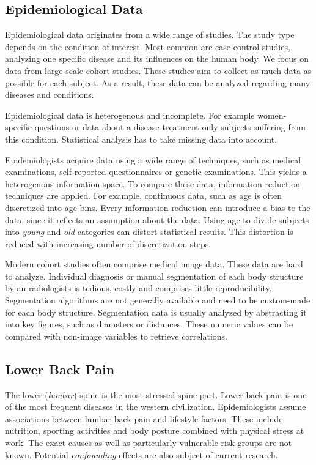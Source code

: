 \documentclass[a4paper,twoside]{style/article}
\begin{document}
\subsection{Epidemiological Data}
Epidemiological data originates from a wide range of studies.
The study type depends on the condition of interest.
Most common are case-control studies, analyzing one specific disease and its influences on the human body.
We focus on data from large scale cohort studies.
These studies aim to collect as much data as possible for each subject.
As a result, these data can be analyzed regarding many diseases and conditions.

Epidemiological data is heterogenous and incomplete.
For example women-specific questions or data about a disease treatment only subjects suffering from this condition.
Statistical analysis has to take missing data into account.

Epidemiologists acquire data using a wide range of techniques, such as medical examinations, self reported questionnaires or genetic examinations.
This yields a heterogenous information space.
To compare these data, information reduction techniques are applied.
For example, continuous data, such as age is often discretized into age-bins.
Every information reduction can introduce a bias to the data, since it reflects an assumption about the data.
Using age to divide subjects into \emph{young} and \emph{old} categories can distort statistical results.
This distortion is reduced with increasing number of discretization steps.

Modern cohort studies often comprise medical image data.
These data are hard to analyze.
Individual diagnosis or manual segmentation of each body structure by an radiologists is tedious, costly and comprises little reproducibility.
Segmentation algorithms are not generally available and need to be custom-made for each body structure.
Segmentation data is usually analyzed by abstracting it into key figures, such as diameters or distances.
These numeric values can be compared with non-image variables to retrieve correlations.
\subsection{Lower Back Pain}
The lower (\emph{lumbar}) spine is the most stressed spine part.
Lower back pain is one of the most frequent diseases in the western civilization.
Epidemiologists assume associations between lumbar back pain and lifestyle factors.
These include nutrition, sporting activities and body posture combined with physical stress at work.
The exact causes as well as particularly vulnerable risk groups are not known.
Potential \emph{confounding} effects are also subject of current research.
\end{document}

